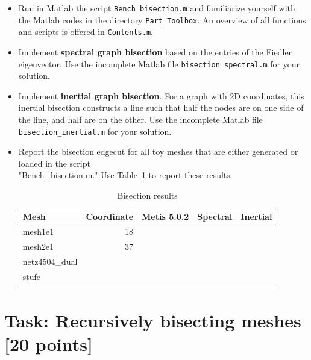 \documentclass[unicode,11pt,a4paper,oneside,numbers=endperiod,openany]{scrartcl}
\begin{document}
\begin{itemize}

\item Run in Matlab the script \texttt{Bench\_bisection.m} and familiarize yourself with the Matlab codes in the directory \texttt{Part\_Toolbox}. An overview of all functions and scripts is offered in \texttt{Contents.m}. 

\item Implement \textbf{spectral graph bisection} based on the entries of the Fiedler eigenvector. Use the incomplete Matlab file \texttt{bisection\_spectral.m} for your solution.

\item Implement \textbf{inertial graph bisection}. For a graph with 2D coordinates, this inertial bisection constructs a line such that half the nodes are on one side of the line, and half are on the other.
Use the incomplete Matlab file \texttt{bisection\_inertial.m} for your solution.
 
\item Report the bisection edgecut for all toy meshes that are either generated or loaded in the script \\ "Bench\_bisection.m." Use Table~\ref{table:bisection} to report these results.

\begin{table}[h]
\caption{Bisection results}
\centering
\begin{tabular}{l|r|r|r|r} \hline\hline 
Mesh             &  Coordinate           & Metis 5.0.2  & Spectral & Inertial  \\ \hline
mesh1e1          &   18                   &             &          &           \\             
mesh2e1          &   37                   &             &          &           \\ 
netz4504\_dual   &                        &             &          &           \\ 
stufe            &                        &             &          &           \\ 
\hline \hline
\end{tabular}
\label{table:bisection}
\end{table}

\end{itemize}




\section{Task: Recursively bisecting meshes [20 points]}
\end{document}

